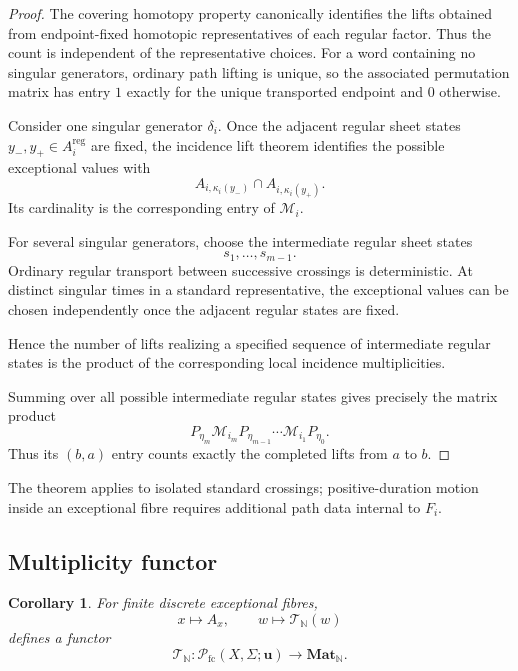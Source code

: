 \documentclass[11pt]{article}
\theoremstyle{plain}
\newtheorem{corollary}[theorem]{Corollary}
\theoremstyle{definition}
\begin{document}
\begin{proof}
The covering homotopy property canonically identifies the lifts obtained from
endpoint-fixed homotopic representatives of each regular factor.  Thus the count is
independent of the representative choices.  For a word containing no singular generators, ordinary path lifting is unique, so
the associated permutation matrix has entry $1$ exactly for the unique
transported endpoint and $0$ otherwise.

Consider one singular generator $\delta_i$.  Once the adjacent regular sheet states
$y_-,y_+\in A_i^{\mathrm{reg}}$ are fixed, the incidence lift theorem identifies the
possible exceptional values with
\[
A_{i,\kappa_i(y_-)}\cap A_{i,\kappa_i(y_+)}.
\]
Its cardinality is the corresponding entry of $\mathcal M_i$.

For several singular generators, choose the intermediate regular sheet
states
\[
s_1,\ldots,s_{m-1}.
\]
Ordinary regular transport between successive crossings is deterministic.
At distinct singular times in a standard representative, the exceptional values can be chosen independently once the adjacent regular states are fixed.

Hence the number of lifts realizing a specified sequence of intermediate
regular states is the product of the corresponding local incidence
multiplicities.

Summing over all possible intermediate regular states gives precisely
the matrix product
\[
P_{\eta_m}
\mathcal M_{i_m}
P_{\eta_{m-1}}
\cdots
\mathcal M_{i_1}
P_{\eta_0}.
\]
Thus its $(b,a)$ entry counts exactly the completed lifts from $a$ to
$b$.
\end{proof}

The theorem applies to isolated standard crossings; positive-duration motion inside an exceptional fibre requires additional path data internal to $F_i$.

\subsection{Multiplicity functor}
\label{subsec:multiplicity-functor}

\begin{corollary}
\label{cor:multiplicity-functor}
For finite discrete exceptional fibres,
\[
x\longmapsto A_x,
\qquad
w\longmapsto\mathscr T_{\mathbb N}(w)
\]
defines a functor
\[
\mathscr T_{\mathbb N}:
\mathcal P_{\mathrm{fc}}(X,\Sigma;\mathbf u)
\longrightarrow
\mathbf{Mat}_{\mathbb N}.
\]
\end{corollary}
\end{document}
